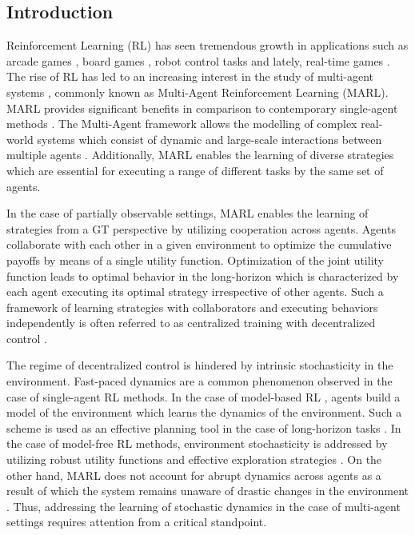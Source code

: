 \documentclass{article}
\begin{document}
\begin{multicols}{2}

\section{Introduction}
Reinforcement Learning (RL) has seen tremendous growth in applications such as arcade games \cite{atari}, board games \cite{go, shogi}, robot control tasks \cite{ddpg, ppo} and lately, real-time games \cite{SC2}. The rise of RL has led to an increasing interest in the study of multi-agent systems \cite{maddpg, alphastar}, commonly known as Multi-Agent Reinforcement Learning (MARL). MARL provides significant benefits in comparison to contemporary single-agent methods \cite{rl}. The Multi-Agent framework allows the modelling of complex real-world systems which consist of dynamic and large-scale interactions between multiple agents \cite{ltc}. Additionally, MARL enables the learning of diverse strategies which are essential for executing a range of different tasks by the same set of agents. 

In the case of partially observable settings, MARL enables the learning of strategies from a GT perspective by utilizing cooperation across agents\cite{cooperative}. Agents collaborate with each other in a given environment to optimize the cumulative payoffs by means of a single utility function. Optimization of the joint utility function leads to optimal behavior \cite{gt,selective} in the long-horizon which is characterized by each agent executing its optimal strategy irrespective of other agents. Such a framework of learning strategies with collaborators and executing behaviors independently is often referred to as centralized training with decentralized control \cite{coma}.

The regime of decentralized control is hindered by intrinsic stochasticity in the environment. Fast-paced dynamics are a common phenomenon observed in the case of single-agent RL methods. In the case of model-based RL \cite{mbrl}, agents build a model of the environment which learns the dynamics of the environment. Such a scheme is used as an effective planning tool in the case of long-horizon tasks \cite{smirl}. In the case of model-free RL methods, environment stochasticity is addressed by utilizing robust utility functions \cite{surprise,surpmodeling} and effective exploration strategies \cite{gen}. On the other hand, MARL does not account for abrupt dynamics across agents as a result of which the system remains unaware of drastic changes in the environment \cite{role}. Thus, addressing the learning of stochastic dynamics in the case of multi-agent settings requires attention from a critical standpoint.


\end{multicols}
\end{document}

